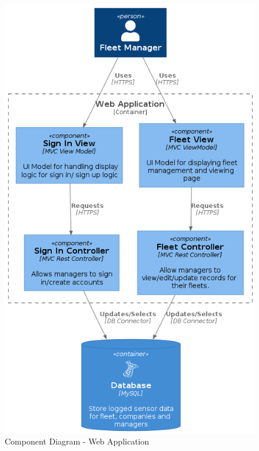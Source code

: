 \begin{figure}
\centering
\includegraphics[scale=0.6]{webapp_component.png}
\caption{Component Diagram - Web Application}
\label{fig:webapp_component}
\end{figure}

\pagebreak
